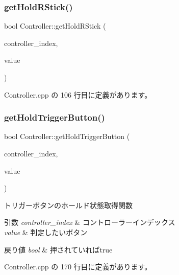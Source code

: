 \subsubsection{\texorpdfstring{get\+Hold\+R\+Stick()}{getHoldRStick()}}
{\footnotesize\ttfamily bool Controller\+::get\+Hold\+R\+Stick (\begin{DoxyParamCaption}\item[{int}]{controller\+\_\+index,  }\item[{\mbox{\hyperlink{class_controller_a08e36bbdccc56ce55cdbd5dcc0f438d4}{Controller\+::\+Direction}}}]{value }\end{DoxyParamCaption})}



 Controller.\+cpp の 106 行目に定義があります。

\mbox{\label{class_controller_acf3ce5dd4a886553f53a237ec02383ac}} 
\subsubsection{\texorpdfstring{get\+Hold\+Trigger\+Button()}{getHoldTriggerButton()}}
{\footnotesize\ttfamily bool Controller\+::get\+Hold\+Trigger\+Button (\begin{DoxyParamCaption}\item[{int}]{controller\+\_\+index,  }\item[{\mbox{\hyperlink{class_controller_abd7dd769d06d277d3aae9afcf135a4ee}{Controller\+::\+Trigger\+Button}}}]{value }\end{DoxyParamCaption})}



トリガーボタンのホールド状態取得関数 


\begin{DoxyParams}{引数}
{\em controller\+\_\+index} & コントローラーインデックス \\
\hline
{\em value} & 判定したいボタン \\
\hline
\end{DoxyParams}

\begin{DoxyRetVals}{戻り値}
{\em bool} & 押されていればtrue \\
\hline
\end{DoxyRetVals}


 Controller.\+cpp の 170 行目に定義があります。

